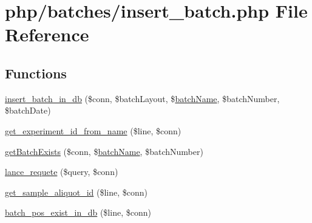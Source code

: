\hypertarget{insert__batch_8php}{\section{php/batches/insert\-\_\-batch.php File Reference}
\label{insert__batch_8php}
}
\subsection*{Functions}
\begin{DoxyCompactItemize}
\item 
\hyperlink{insert__batch_8php_a7ddce3ca15f5aebb7183169ac9b2bf96}{insert\-\_\-batch\-\_\-in\-\_\-db} (\$conn, \$batch\-Layout, \$\hyperlink{obsolete_2processing__bak_8php_aacb4c47c97ff6a475764ba2cf4090a32}{batch\-Name}, \$batch\-Number, \$batch\-Date)
\item 
\hyperlink{insert__batch_8php_ae69544f3503e8738aa18a5f9aff69220}{get\-\_\-experiment\-\_\-id\-\_\-from\-\_\-name} (\$line, \$conn)
\item 
\hyperlink{insert__batch_8php_aca2d979885679313254be10ee45926c9}{get\-Batch\-Exists} (\$conn, \$\hyperlink{obsolete_2processing__bak_8php_aacb4c47c97ff6a475764ba2cf4090a32}{batch\-Name}, \$batch\-Number)
\item 
\hyperlink{insert__batch_8php_a8dcda708772bdee9f9805e5f03be6b86}{lance\-\_\-requete} (\$query, \$conn)
\item 
\hyperlink{insert__batch_8php_acde31c7b204dab42e6f828aac0454d58}{get\-\_\-sample\-\_\-aliquot\-\_\-id} (\$line, \$conn)
\item 
\hyperlink{insert__batch_8php_a655661c97a29e4c4bf1973dcb23c4df7}{batch\-\_\-pos\-\_\-exist\-\_\-in\-\_\-db} (\$line, \$conn)
\end{DoxyCompactItemize}
